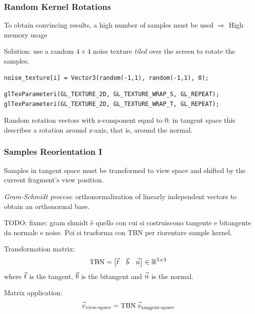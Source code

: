 \documentclass{beamer}
\let\nvec\vec
\def\vec#1{\nvec{\vphantom t\smash{#1}}}
\begin{document}
\begin{frame}[fragile]
\frametitle{Random Kernel Rotations}
To obtain convincing results, a high number of samples must be used $ \Rightarrow $ High memory usage

Solution: use a random $ 4\times4 $ noise texture \emph{tiled} over the screen to rotate the samples.
\begin{verbatim}
noise_texture[i] = Vector3(random(-1,1), random(-1,1), 0);
\end{verbatim}
\vspace{-1cm}
\begin{verbatim}
glTexParameteri(GL_TEXTURE_2D, GL_TEXTURE_WRAP_S, GL_REPEAT);
glTexParameteri(GL_TEXTURE_2D, GL_TEXTURE_WRAP_T, GL_REPEAT);
\end{verbatim} 

Random rotation vectors with z-component equal to 0: in tangent space this describes a rotation around z-axis, that is, around the normal.

\end{frame}

\begin{frame}
\frametitle{Samples Reorientation I}
Samples in tangent space must be transformed to view space and shifted by the current fragment's view position.

\emph{Gram-Schmidt process}: orthonormalization of linearly independent vectors to obtain an orthonormal base.


TODO: fixme: gram shmidt è quello con cui si costruiscono tangente e bitangente da normale e noise. Poi si trasforma con TBN per riorentare sample kernel.

Transformation matrix:
\[
\text{TBN} = 
\begin{bmatrix}
\vec{t} & \vec{b} & \vec{n}
\end{bmatrix} \in \mathbb{R}^{3\times3}
\]
where $ \vec{t} $ is the tangent, $ \vec{b} $ is the bitangent and $ \vec{n} $ is the normal.

Matrix application:
\[ \vec{v}_{\text{view-space}} = \text{TBN} \; \vec{v}_{\text{tangent-space}} \]
\end{frame}
\end{document}
